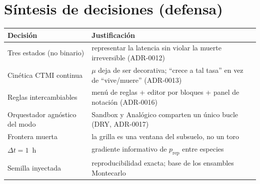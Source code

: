\documentclass[11pt]{article}
\begin{document}
\section*{Síntesis de decisiones (defensa)}
\begin{center}
\small
\begin{tabular}{@{}ll@{}}
\toprule
\textbf{Decisión} & \textbf{Justificación} \\
\midrule
Tres estados (no binario) & representar la latencia sin violar la muerte irreversible (ADR-0012)\\
Cinética CTMI continua & $\mu$ deja de ser decorativa; ``crece a tal tasa'' en vez de ``vive/muere'' (ADR-0013)\\
Reglas intercambiables & menú de reglas + editor por bloques + panel de notación (ADR-0016)\\
Orquestador agnóstico del modo & Sandbox y Analógico comparten un único bucle (DRY, ADR-0017)\\
Frontera muerta & la grilla es una ventana del subsuelo, no un toro\\
$\Delta t = 1$~h & gradiente informativo de $p_{\mathrm{rep}}$ entre especies\\
Semilla inyectada & reproducibilidad exacta; base de los ensambles Montecarlo\\
\bottomrule
\end{tabular}
\end{center}
\end{document}
